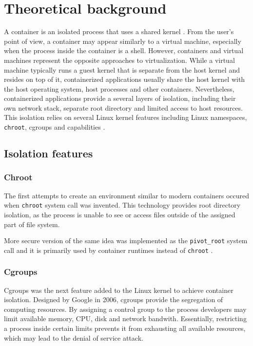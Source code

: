 \section{Theoretical background}

A container is an isolated process that uses a shared kernel \cite{1}. From the user's point of view, a container may appear similarly to a virtual machine, especially when the process inside the container is a shell. However, containers and virtual machines represent the opposite approaches to virtualization. While a virtual machine typically runs a guest kernel that is separate from the host kernel and resides on top of it, containerized applications usually share the host kernel with the host operating system, host processes and other containers. Nevertheless, containerized applications provide a several layers of isolation, including their own network stack, separate root directory and limited access to host resources. This isolation relies on several Linux kernel features including Linux namespaces, \texttt{chroot}, cgroups and capabilities \cite{book:rice}.

\subsection{Isolation features}

\subsubsection{Chroot}

The first attempts to create an environment similar to modern containers occured when \texttt{chroot} system call was invented. This technology provides root directory isolation, as the process is unable to see or access files outside of the assigned part of file system.

More secure version of the same idea was implemented as the \texttt{pivot\_root} system call and it is primarily used by container runtimes instead of \texttt{chroot} \cite{book:rice}.

\subsubsection{Cgroups}

Cgroups was the next feature added to the Linux kernel to achieve container isolation. Designed by Google in 2006, cgroups provide the segregation of computing resources. By assigning a control group to the process developers may limit available memory, CPU, disk and network bandwith. Essentially, restricting a process inside certain limits prevents it from exhausting all available resources, which may lead to the denial of service attack.

